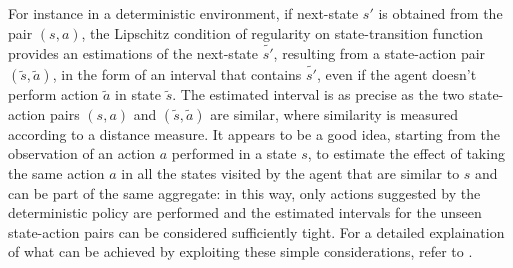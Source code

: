 For instance in a deterministic environment, if next-state $s'$ is obtained from the pair $(s, a)$, the Lipschitz condition of regularity on state-transition function provides an estimations of the next-state $\widetilde{s'}$, resulting from a state-action pair $(\widetilde{s}, \widetilde{a})$, in the form of an interval that contains $\widetilde{s'}$, even if the agent doesn't perform action $\widetilde{a}$ in state $\widetilde{s}$. The estimated interval is as precise as the two state-action pairs $(s, a)$ and $(\widetilde{s}, \widetilde{a})$ are similar, where similarity is measured according to a distance measure.
It appears to be a good idea, starting from the observation of an action $a$ performed in a state $s$, to estimate the effect of taking the same action $a$ in all the states visited by the agent that are similar to $s$ and can be part of the same aggregate: in this way, only actions suggested by the deterministic policy are performed and the estimated intervals for the unseen state-action pairs can be considered sufficiently tight. For a detailed explaination of what can be achieved by exploiting these simple considerations, refer to .
